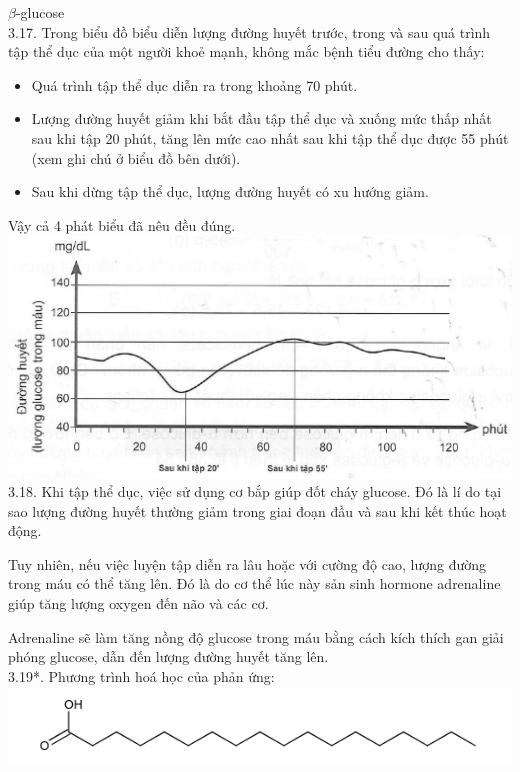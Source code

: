 \documentclass[10pt]{article}
\begin{document}
$\beta$-glucose\\
3.17. Trong biểu đồ biểu diễn lượng đường huyết trước, trong và sau quá trình tập thể dục của một người khoẻ mạnh, không mắc bệnh tiểu đường cho thấy:

\begin{itemize}
  \item Quá trình tập thể dục diễn ra trong khoảng 70 phút.
  \item Lượng đường huyết giảm khi bắt đầu tập thể dục và xuống mức thấp nhất sau khi tập 20 phút, tăng lên mức cao nhất sau khi tập thể dục được 55 phút (xem ghi chú ở biểu đồ bên dưới).
  \item Sau khi dừng tập thể dục, lượng đường huyết có xu hướng giảm.
\end{itemize}

Vậy cả 4 phát biểu đã nêu đều đúng.\\
\includegraphics[max width=\textwidth, center]{2025_10_23_b4e16b74380d0f7e7700g-027}\\
3.18. Khi tập thể dục, việc sử dụng cơ bắp giúp đốt cháy glucose. Đó là lí do tại sao lượng đường huyết thường giảm trong giai đoạn đầu và sau khi kết thúc hoạt động.

Tuy nhiên, nếu việc luyện tập diễn ra lâu hoặc với cường độ cao, lượng đường trong máu có thể tăng lên. Đó là do cơ thể lúc này sản sinh hormone adrenaline giúp tăng lượng oxygen đến não và các cơ.

Adrenaline sẽ làm tăng nồng độ glucose trong máu bằng cách kích thích gan giải phóng glucose, dẫn đến lượng đường huyết tăng lên.\\
3.19*. Phương trình hoá học của phản ứng:\\
\includegraphics{smile-0881356f05c4158c3ec0f2dc5af676ad6bf03d05}
\end{document}

